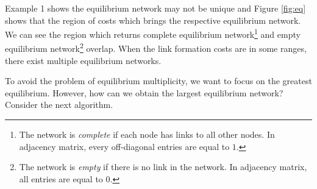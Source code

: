 \documentclass[12pt]{article}
\theoremstyle{definition}
\begin{document}
Example 1 shows the equilibrium network may not be unique and Figure \ref{fig:eq} shows that the region of costs which brings the respective equilibrium network.
We can see the region which returns complete equilibrium network\footnote{The network is {\it{complete}} if each node has links to all other nodes. In adjacency matrix, every off-diagonal entries are equal to $1$.} and empty equilibrium network\footnote{The network is {\it{empty}} if there is no link in the network. In adjacency matrix, all entries are equal to $0$.} overlap.
When the link formation costs are in some ranges, there exist multiple equilibrium networks.

To avoid the problem of equilibrium multiplicity, we want to focus on the greatest equilibrium.
However, how can we obtain the largest equilibrium network?
Consider the next algorithm.
\end{document}
